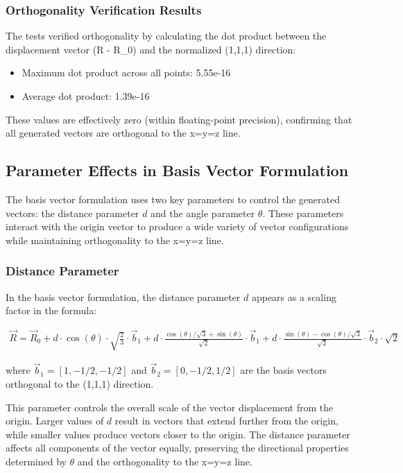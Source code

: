 \subsubsection{Orthogonality Verification Results}

The tests verified orthogonality by calculating the dot product between the displacement vector (R - R\_0) and the normalized (1,1,1) direction:

\begin{itemize}
    \item Maximum dot product across all points: 5.55e-16
    \item Average dot product: 1.39e-16
\end{itemize}

These values are effectively zero (within floating-point precision), confirming that all generated vectors are orthogonal to the x=y=z line.

\subsection{Parameter Effects in Basis Vector Formulation}

The basis vector formulation uses two key parameters to control the generated vectors: the distance parameter $d$ and the angle parameter $\theta$. These parameters interact with the origin vector to produce a wide variety of vector configurations while maintaining orthogonality to the x=y=z line.

\subsubsection{Distance Parameter}

In the basis vector formulation, the distance parameter $d$ appears as a scaling factor in the formula:

\begin{align}
\vec{R} = \vec{R}_0 + d \cdot \cos(\theta) \cdot \sqrt{\frac{2}{3}} \cdot \vec{b}_1 + d \cdot \frac{\cos(\theta)/\sqrt{3} + \sin(\theta)}{\sqrt{2}} \cdot \vec{b}_1 + d \cdot \frac{\sin(\theta) - \cos(\theta)/\sqrt{3}}{\sqrt{2}} \cdot \vec{b}_2 \cdot \sqrt{2}
\end{align}

where $\vec{b}_1 = [1, -1/2, -1/2]$ and $\vec{b}_2 = [0, -1/2, 1/2]$ are the basis vectors orthogonal to the (1,1,1) direction.

This parameter controls the overall scale of the vector displacement from the origin. Larger values of $d$ result in vectors that extend further from the origin, while smaller values produce vectors closer to the origin. The distance parameter affects all components of the vector equally, preserving the directional properties determined by $\theta$ and the orthogonality to the x=y=z line.

